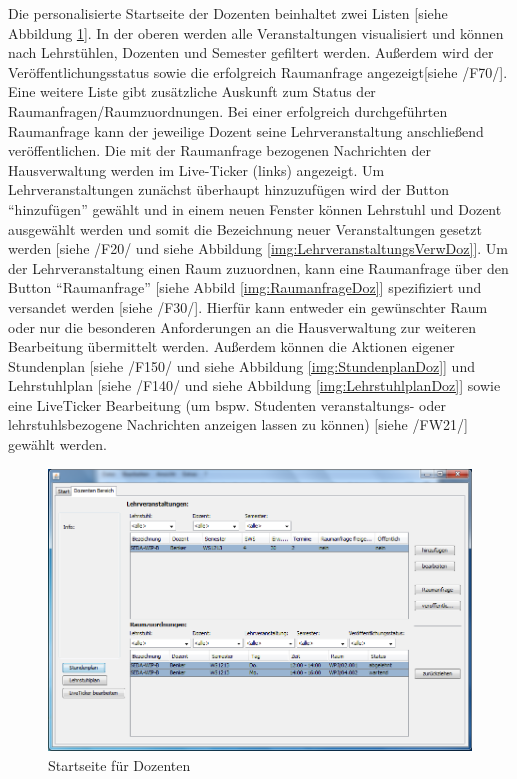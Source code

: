 Die personalisierte Startseite der Dozenten beinhaltet zwei Listen [siehe Abbildung \ref{img:StartDoz}]. In der oberen werden alle Veranstaltungen visualisiert und können nach Lehrstühlen, Dozenten und Semester gefiltert werden. Außerdem wird der Veröffentlichungsstatus sowie die erfolgreich Raumanfrage angezeigt[siehe /F70/]. Eine weitere Liste gibt zusätzliche Auskunft zum Status der Raumanfragen/Raumzuordnungen. Bei einer erfolgreich durchgeführten Raumanfrage kann der jeweilige Dozent seine Lehrveranstaltung anschließend veröffentlichen. Die mit der Raumanfrage bezogenen Nachrichten der Hausverwaltung werden im Live-Ticker (links) angezeigt.
Um Lehrveranstaltungen zunächst überhaupt hinzuzufügen wird der Button "`hinzufügen"' gewählt und in einem neuen Fenster können Lehrstuhl und Dozent ausgewählt werden und somit die Bezeichnung neuer Veranstaltungen gesetzt werden [siehe /F20/ und siehe Abbildung \ref{img:LehrveranstaltungsVerwDoz}]. 
Um der Lehrveranstaltung einen Raum zuzuordnen, kann eine Raumanfrage über den Button "`Raumanfrage"' [siehe Abbild \ref{img:RaumanfrageDoz}] spezifiziert und versandet werden [siehe /F30/]. Hierfür kann entweder ein gewünschter Raum oder nur die besonderen Anforderungen an die Hausverwaltung zur weiteren Bearbeitung übermittelt werden.
Außerdem können die Aktionen eigener Stundenplan [siehe /F150/ und siehe Abbildung \ref{img:StundenplanDoz}] und Lehrstuhlplan [siehe /F140/ und siehe Abbildung \ref{img:LehrstuhlplanDoz}] sowie eine LiveTicker Bearbeitung (um bspw. Studenten veranstaltungs- oder lehrstuhlsbezogene Nachrichten anzeigen lassen zu können) [siehe /FW21/] gewählt werden.


\begin{figure}[H]
\begin{center}
\includegraphics[width=150mm]{images/section_7/DozentenHauptseite.PNG}
\caption{Startseite für Dozenten}
\label{img:StartDoz}
\end{center}
\end{figure}



